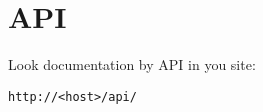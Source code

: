 \newpage
\chapter{API}

Look documentation by API in you site:
\begin{Verbatim}[frame=single]
http://<host>/api/
\end{Verbatim}






